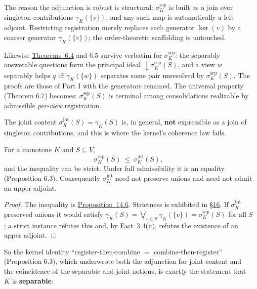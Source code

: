 The reason the adjunction is robust is structural: \(\sigma^{\mathrm{sep}}_K\) is built as a join over singleton contributions \(\gamma_K(\{v\})\), and any such map is automatically a left adjoint. Restricting registration merely replaces each generator \(\ker(v)\) by a coarser generator \(\gamma_K(\{v\})\); the order-theoretic scaffolding is untouched.

Likewise \hyperlink{stmt:6.4}{Theorems~6.4} and 6.5 survive verbatim for \(\sigma^{\mathrm{sep}}_K\): the separably answerable questions form the principal ideal \({\downarrow}\sigma^{\mathrm{sep}}_K(S)\), and a view \(w\) separably helps \(q\) iff \(\gamma_K(\{w\})\) separates some pair unresolved by \(\sigma^{\mathrm{sep}}_K(S)\). The proofs are those of Part I with the generators renamed. The universal property (Theorem 6.7) becomes: \(\sigma^{\mathrm{sep}}_K(S)\) is terminal among consolidations realizable by admissible \emph{per-view} registration.


The joint content \(\sigma^{\mathrm{jnt}}_K(S)=\gamma_K(S)\) is, in general, \textbf{not} expressible as a join of singleton contributions, and this is where the kernel's coherence law fails.

\begin{thmplain}

For a monotone \(K\) and \(S\subseteq V\),
\[
\sigma^{\mathrm{sep}}_K(S)\ \le\ \sigma^{\mathrm{jnt}}_K(S),
\]
and the inequality can be strict. Under full admissibility it is an equality (Proposition 6.3). Consequently \(\sigma^{\mathrm{jnt}}_K\) need not preserve unions and need not admit an upper adjoint.
\end{thmplain}

\begin{proof}

The inequality is \hyperlink{stmt:14.6}{Proposition~14.6}. Strictness is exhibited in \hyperlink{sec:16}{§16}. If \(\sigma^{\mathrm{jnt}}_K\) preserved unions it would satisfy \(\gamma_K(S)=\bigvee_{v\in S}\gamma_K(\{v\})=\sigma^{\mathrm{sep}}_K(S)\) for all \(S\); a strict instance refutes this and, by \hyperlink{stmt:3.4}{Fact~3.4}(ii), refutes the existence of an upper adjoint.
\end{proof}

So the kernel identity ``register-then-combine \(=\) combine-then-register'' (Proposition 6.3), which underwrote both the adjunction for joint content and the coincidence of the separable and joint notions, is exactly the statement that \(K\) is \textbf{separable}:

